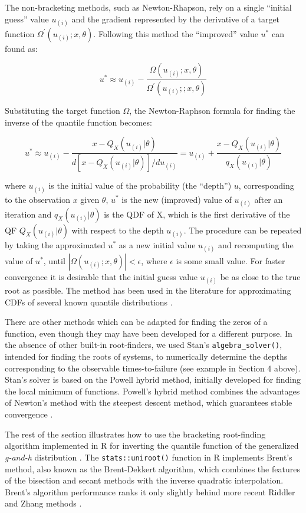 \documentclass[
  12pt,
]{article}
\begin{document}
The non-bracketing methods, such as Newton-Rhapson, rely on a single ``initial guess'' value \(u_{(i)}\) and the gradient represented by the derivative of a target function \(\Omega^\prime(u_{(i)};x,\theta)\). Following this method the ``improved'' value \(u^*\) can found as:

\[
u^*\approx u_{(i)} -\frac{\Omega(u_{(i)};x,\theta)}{\Omega^\prime(u_{(i)};;x,\theta)}
\]

Substituting the target function \(\Omega\), the Newton-Raphson formula for finding the inverse of the quantile function becomes:

\[
u^*\approx u_{(i)}-\frac{x-Q_X(u_{(i)}|\theta)}{d[x-Q_X(u_{(i)}|\theta)]/du_{(i)}}= u_{(i)}+\frac{x-Q_X(u_{(i)}|\theta)}{q_X(u_{(i)}|\theta)}
\]

where \(u_{(i)}\) is the initial value of the probability (the ``depth'') \(u\), corresponding to the observation \(x\) given \(\theta\), \(u^*\) is the new (improved) value of \(u_{(i)}\) after an iteration and \(q_X(u_{(i)}|\theta)\) is the QDF of X, which is the first derivative of the QF \(Q_X(u_{(i)}|\theta)\) with respect to the depth \(u_{(i)}\). The procedure can be repeated by taking the approximated \(u^*\) as a new initial value \(u_{(i)}\) and recomputing the value of \(u^*\), until \(|\Omega(u_{(i)};x,\theta)|< \epsilon\), where \(\epsilon\) is some small value. For faster convergence it is desirable that the initial guess value \(u_{(i)}\) be as close to the true root as possible. The method has been used in the literature for approximating CDFs of several known quantile distributions \citetext{\citealp[see p.99 in][]{gilchrist2000StatisticalModellingQuantile}; \citealp[p.345 in][]{nair2013QuantileBasedReliabilityAnalysis}}.

There are other methods which can be adapted for finding the zeros of a function, even though they may have been developed for a different purpose. In the absence of other built-in root-finders, we used Stan's \texttt{algebra\_solver()}, intended for finding the roots of systems, to numerically determine the depths corresponding to the observable times-to-failure (see example in Section 4 above). Stan's solver is based on the Powell hybrid method, initially developed for finding the local minimum of functions. Powell's hybrid method combines the advantages of Newton's method with the steepest descent method, which guarantees stable convergence \citep{powell1970HybridMethodNonlinear}.

The rest of the section illustrates how to use the bracketing root-finding algorithm implemented in R for inverting the quantile function of the generalized \emph{g-and-h} distribution \citep{rayner2002NumericalMaximumLikelihood}. The \texttt{stats::uniroot()} function in R implements Brent's method, also known as the Brent-Dekkert algorithm, which combines the features of the bisection and secant methods with the inverse quadratic interpolation. Brent's algorithm performance ranks it only slightly behind more recent Riddler and Zhang methods \citep{stage2013CommentsImprovementBrent, zhang2011ImprovementBrentMethod}.
\end{document}

